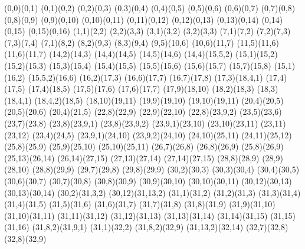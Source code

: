 \begin{sseqpage}[ classes = fill, class labels = {right = 0.02em }, xscale = 0.7, yscale=0.7, axes gap = 0.6cm ]
\structline(0,0)(0,1)
\structline(0,1)(0,2)
\structline(0,2)(0,3)
\structline(0,3)(0,4)
\structline(0,4)(0,5)
\structline(0,5)(0,6)
\structline(0,6)(0,7)
\structline(0,7)(0,8)
\structline(0,8)(0,9)
\structline(0,9)(0,10)
\structline(0,10)(0,11)
\structline(0,11)(0,12)
\structline(0,12)(0,13)
\structline(0,13)(0,14)
\structline(0,14)(0,15)
\structline(0,15)(0,16)
\structline(1,1)(2,2)
\structline(2,2)(3,3)
\structline(3,1)(3,2)
\structline(3,2)(3,3)
\structline(7,1)(7,2)
\structline(7,2)(7,3)
\structline(7,3)(7,4)
\structline(7,1)(8,2)
\structline(8,2)(9,3)
\structline(8,3)(9,4)
\structline(9,5)(10,6)
\structline(10,6)(11,7)
\structline(11,5)(11,6)
\structline(11,6)(11,7)
\structline(14,2)(14,3)
\structline(14,4)(14,5)
\structline(14,5)(14,6)
\structline(14,4)(15,5,2)
\structline(15,1)(15,2)
\structline(15,2)(15,3)
\structline(15,3)(15,4)
\structline(15,4)(15,5)
\structline(15,5)(15,6)
\structline(15,6)(15,7)
\structline(15,7)(15,8)
\structline(15,1)(16,2)
\structline(15,5,2)(16,6)
\structline(16,2)(17,3)
\structline(16,6)(17,7)
\structline(16,7)(17,8)
\structline(17,3)(18,4,1)
\structline(17,4)(17,5)
\structline(17,4)(18,5)
\structline(17,5)(17,6)
\structline(17,6)(17,7)
\structline(17,9)(18,10)
\structline(18,2)(18,3)
\structline(18,3)(18,4,1)
\structline(18,4,2)(18,5)
\structline(18,10)(19,11)
\structline(19,9)(19,10)
\structline(19,10)(19,11)
\structline(20,4)(20,5)
\structline(20,5)(20,6)
\structline(20,4)(21,5)
\structline(22,8)(22,9)
\structline(22,9)(22,10)
\structline(22,8)(23,9,2)
\structline(23,5)(23,6)
\structline(23,7)(23,8)
\structline(23,8)(23,9,1)
\structline(23,8)(23,9,2)
\structline(23,9,1)(23,10)
\structline(23,10)(23,11)
\structline(23,11)(23,12)
\structline(23,4)(24,5)
\structline(23,9,1)(24,10)
\structline(23,9,2)(24,10)
\structline(24,10)(25,11)
\structline(24,11)(25,12)
\structline(25,8)(25,9)
\structline(25,9)(25,10)
\structline(25,10)(25,11)
\structline(26,7)(26,8)
\structline(26,8)(26,9)
\structline(25,8)(26,9)
\structline(25,13)(26,14)
\structline(26,14)(27,15)
\structline(27,13)(27,14)
\structline(27,14)(27,15)
\structline(28,8)(28,9)
\structline(28,9)(28,10)
\structline(28,8)(29,9)
\structline(29,7)(29,8)
\structline(29,8)(29,9)
\structline(30,2)(30,3)
\structline(30,3)(30,4)
\structline(30,4)(30,5)
\structline(30,6)(30,7)
\structline(30,7)(30,8)
\structline(30,8)(30,9)
\structline(30,9)(30,10)
\structline(30,10)(30,11)
\structline(30,12)(30,13)
\structline(30,13)(30,14)
\structline(30,2)(31,3,2)
\structline(30,12)(31,13,2)
\structline(31,1)(31,2)
\structline(31,2)(31,3)
\structline(31,3)(31,4)
\structline(31,4)(31,5)
\structline(31,5)(31,6)
\structline(31,6)(31,7)
\structline(31,7)(31,8)
\structline(31,8)(31,9)
\structline(31,9)(31,10)
\structline(31,10)(31,11)
\structline(31,11)(31,12)
\structline(31,12)(31,13)
\structline(31,13)(31,14)
\structline(31,14)(31,15)
\structline(31,15)(31,16)
\structline(31,8,2)(31,9,1)
\structline(31,1)(32,2)
\structline(31,8,2)(32,9)
\structline(31,13,2)(32,14)
\structline(32,7)(32,8)
\structline(32,8)(32,9)


\end{sseqpage}

